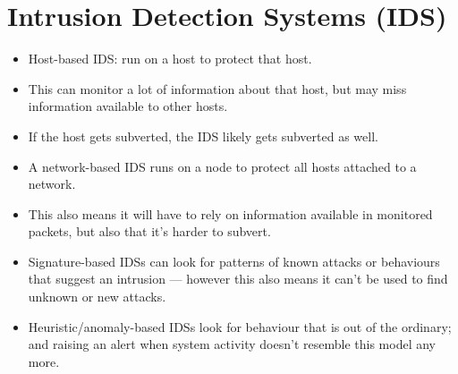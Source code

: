 \documentclass{article}
\begin{document}
\section{Intrusion Detection Systems (IDS)}
\begin{itemize}
    \item Host-based IDS: run on a host to protect that host.
    \item This can monitor a lot of information about that host, but may miss information available to other hosts.
    \item If the host gets subverted, the IDS likely gets subverted as well.
    \item A network-based IDS runs on a node to protect all hosts attached to a network.
    \item This also means it will have to rely on information available in monitored packets, but also that it's harder to subvert.
    \item Signature-based IDSs can look for patterns of known attacks or behaviours that suggest an intrusion --- however this also means it can't be used to find unknown or new attacks.
    \item Heuristic/anomaly-based IDSs look for behaviour that is out of the ordinary; and raising an alert when system activity doesn't resemble this model any more.
\end{itemize}
\end{document}
